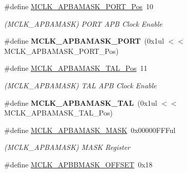 \begin{DoxyCompactItemize}
\item 
\hypertarget{group___s_a_m_l21___m_c_l_k_ga30ff98490972c5a9bbcc79575ea7faa8}{}\#define \hyperlink{group___s_a_m_l21___m_c_l_k_ga30ff98490972c5a9bbcc79575ea7faa8}{M\+C\+L\+K\+\_\+\+A\+P\+B\+A\+M\+A\+S\+K\+\_\+\+P\+O\+R\+T\+\_\+\+Pos}~10\label{group___s_a_m_l21___m_c_l_k_ga30ff98490972c5a9bbcc79575ea7faa8}

\begin{DoxyCompactList}\small\item\em (M\+C\+L\+K\+\_\+\+A\+P\+B\+A\+M\+A\+S\+K) P\+O\+R\+T A\+P\+B Clock Enable \end{DoxyCompactList}\item 
\hypertarget{group___s_a_m_l21___m_c_l_k_ga98f63a040a2d8bc584bf533d95242515}{}\#define {\bfseries M\+C\+L\+K\+\_\+\+A\+P\+B\+A\+M\+A\+S\+K\+\_\+\+P\+O\+R\+T}~(0x1ul $<$$<$ M\+C\+L\+K\+\_\+\+A\+P\+B\+A\+M\+A\+S\+K\+\_\+\+P\+O\+R\+T\+\_\+\+Pos)\label{group___s_a_m_l21___m_c_l_k_ga98f63a040a2d8bc584bf533d95242515}

\item 
\hypertarget{group___s_a_m_l21___m_c_l_k_gaa8ca7fab582590a43369763a5183fb4e}{}\#define \hyperlink{group___s_a_m_l21___m_c_l_k_gaa8ca7fab582590a43369763a5183fb4e}{M\+C\+L\+K\+\_\+\+A\+P\+B\+A\+M\+A\+S\+K\+\_\+\+T\+A\+L\+\_\+\+Pos}~11\label{group___s_a_m_l21___m_c_l_k_gaa8ca7fab582590a43369763a5183fb4e}

\begin{DoxyCompactList}\small\item\em (M\+C\+L\+K\+\_\+\+A\+P\+B\+A\+M\+A\+S\+K) T\+A\+L A\+P\+B Clock Enable \end{DoxyCompactList}\item 
\hypertarget{group___s_a_m_l21___m_c_l_k_ga498e85b5425f9308dea0ac83ec8be49c}{}\#define {\bfseries M\+C\+L\+K\+\_\+\+A\+P\+B\+A\+M\+A\+S\+K\+\_\+\+T\+A\+L}~(0x1ul $<$$<$ M\+C\+L\+K\+\_\+\+A\+P\+B\+A\+M\+A\+S\+K\+\_\+\+T\+A\+L\+\_\+\+Pos)\label{group___s_a_m_l21___m_c_l_k_ga498e85b5425f9308dea0ac83ec8be49c}

\item 
\hypertarget{group___s_a_m_l21___m_c_l_k_ga85274982e658543846410257d8741368}{}\#define \hyperlink{group___s_a_m_l21___m_c_l_k_ga85274982e658543846410257d8741368}{M\+C\+L\+K\+\_\+\+A\+P\+B\+A\+M\+A\+S\+K\+\_\+\+M\+A\+S\+K}~0x00000\+F\+F\+Ful\label{group___s_a_m_l21___m_c_l_k_ga85274982e658543846410257d8741368}

\begin{DoxyCompactList}\small\item\em (M\+C\+L\+K\+\_\+\+A\+P\+B\+A\+M\+A\+S\+K) M\+A\+S\+K Register \end{DoxyCompactList}\item 
\hypertarget{group___s_a_m_l21___m_c_l_k_ga8c35b6e1cf5ad6b7de3361646bc0510f}{}\#define \hyperlink{group___s_a_m_l21___m_c_l_k_ga8c35b6e1cf5ad6b7de3361646bc0510f}{M\+C\+L\+K\+\_\+\+A\+P\+B\+B\+M\+A\+S\+K\+\_\+\+O\+F\+F\+S\+E\+T}~0x18\label{group___s_a_m_l21___m_c_l_k_ga8c35b6e1cf5ad6b7de3361646bc0510f}


\end{DoxyCompactItemize}
